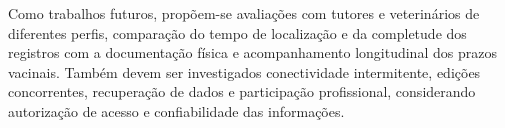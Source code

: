 \documentclass{UNESC}
\begin{document}
Como trabalhos futuros, propõem-se avaliações com tutores e veterinários de diferentes perfis, comparação do tempo de localização e da completude dos registros com a documentação física e acompanhamento longitudinal dos prazos vacinais. Também devem ser investigados conectividade intermitente, edições concorrentes, recuperação de dados e participação profissional, considerando autorização de acesso e confiabilidade das informações.


\renewcommand{\refname}{REFERÊNCIAS}

\end{document}
